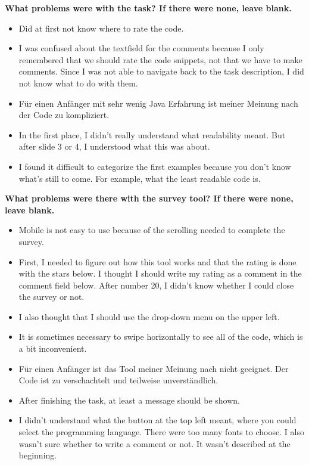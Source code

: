 \documentclass[%
class=scrreprt,
chapterprefix=false,%
open=right,%
twoside=false,%
paper=a4,%
logofile={Logo\_zentral\_farbig\_EN.png},%
thesistype=master,%
UKenglish,%
]{se2thesis}
\theoremstyle{definition}
\begin{document}
	\textbf{What problems were with the task? If there were none, leave blank.}
	\begin{itemize}
		\item Did at first not know where to rate the code.
		\item I was confused about the textfield for the comments because I only remembered that we should rate the code snippets, not that we have to make comments. Since I was not able to navigate back to the task description, I did not know what to do with them.
		\item Für einen Anfänger mit sehr wenig Java Erfahrung ist meiner Meinung nach der Code zu kompliziert.
		\item In the first place, I didn't really understand what readability meant. But after slide 3 or 4, I understood what this was about.
		\item I found it difficult to categorize the first examples because you don't know what's still to come. For example, what the least readable code is.
	\end{itemize}

	\textbf{What problems were there with the survey tool? If there were none, leave blank.}
	\begin{itemize}
		\item Mobile is not easy to use because of the scrolling needed to complete the survey.
		\item First, I needed to figure out how this tool works and that the rating is done with the stars below. I thought I should write my rating as a comment in the comment field below. After number 20, I didn't know whether I could close the survey or not.
		\item I also thought that I should use the drop-down menu on the upper left.
		\item It is sometimes necessary to swipe horizontally to see all of the code, which is a bit inconvenient.
		\item Für einen Anfänger ist das Tool meiner Meinung nach nicht geeignet. Der Code ist zu verschachtelt und teilweise unverständlich.
		\item After finishing the task, at least a message should be shown.
		\item I didn't understand what the button at the top left meant, where you could select the programming language. There were too many fonts to choose. I also wasn't sure whether to write a comment or not. It wasn't described at the beginning.
	\end{itemize}
\end{document}
